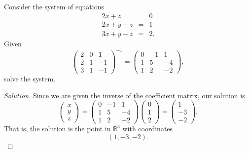 \documentclass[12pt]{amsart}
\begin{document}
\newpage

\begin{thm}[20 Points]\label{ex5}
  Consider the system of equations
  \begin{eqnarray*}
    2x + z &=& 0\\
    2x + y - z &=& 1\\
    3x + y - z &=& 2.
  \end{eqnarray*}
  Given  
  $$\left(\begin{array}{ccc}
    2 & 0 & 1\\
    2 & 1 & -1\\
    3 & 1 & -1
  \end{array}\right)^{-1} = \left(\begin{array}{ccc}
  0 & -1 & 1\\
  1 & 5 & -4\\
  1 & 2 & -2
  \end{array}\right),$$
  solve the system.
  \begin{proof}[Solution]
    Since we are given the inverse of the coefficient matrix, our solution is
    $$\left(\begin{array}{c}
      x\\
      y\\
      z
    \end{array}\right) = 
    \left(\begin{array}{ccc}
      0 & -1 & 1\\
      1 & 5 & -4\\
      1 & 2 & -2
  \end{array}\right)
    \left(\begin{array}{c}
      0\\
      1\\
      2
    \end{array}\right) = 
    \left(\begin{array}{c}
      1\\
      -3\\
      -2
    \end{array}\right).$$
    That is, the solution is the point in $\mathbb{R}^3$ with coordinates
    $$(1, -3, -2).$$
  \end{proof}
\end{thm}


\end{document}

